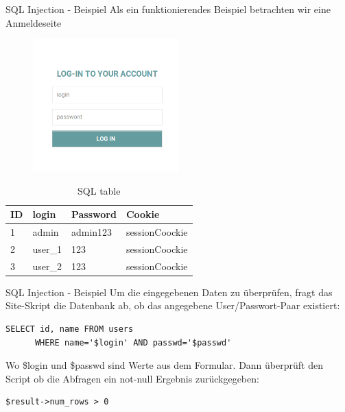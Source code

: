 \documentclass[10pt]{beamer}
\begin{document}
\begin{frame}[fragile]{SQL Injection - Beispiel}
  Als ein funktionierendes Beispiel betrachten wir eine Anmeldeseite
  \newline
  \newline
  \newline
  \begin{minipage}{0.49\textwidth}
    \centering
    \begin{figure}[h]
      \centering
      \includegraphics[width=0.5\textwidth]{sql_ex_1}
    \end{figure}
  \end{minipage}
  \begin{minipage}{0.49\textwidth}
    \centering
    \begin{table}[]
    \scriptsize 
    \centering
      \begin{table}[]
        \centering
        \label{my-label}
        \begin{tabular}{| l | l | l | l |}
          \hline
          ID & login & Password & Cookie \\
          \hline
          1 & admin & admin123 & sessionCoockie \\ 
          2 & user\_1 & 123 & sessionCoockie \\ 
          3 & user\_2 & 123 & sessionCoockie \\ 
          \hline
        \end{tabular} 
        \footnotesize
        \caption{SQL table}
      \end{table}
    \end{table}
  \end{minipage}
\end{frame}

\begin{frame}[fragile]{SQL Injection - Beispiel}
  Um die eingegebenen Daten zu \"uberpr\"ufen, fragt das Site-Skript die Datenbank ab, ob das angegebene User/Passwort-Paar existiert:
  \newline
  \begin{lstlisting}[style=SQLStyle]
    SELECT id, name FROM users
      WHERE name='$login' AND passwd='$passwd'
  \end{lstlisting}
  Wo \$login und \$passwd sind Werte aus dem Formular.
  \newline
  Dann \"uberpr\"uft den Script ob die Abfragen ein not-null Ergebnis zur\"uckgegeben:
  \newline
  \begin{lstlisting}[style=PHPStyle]
    $result->num_rows > 0
  \end{lstlisting}
\end{frame}
\end{document}
